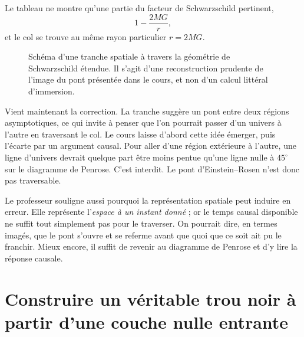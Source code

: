 Le tableau ne montre qu’une partie du facteur de Schwarzschild pertinent,
\begin{equation}
1-\frac{2MG}{r},
\end{equation}
et le col se trouve au même rayon particulier \(r=2MG\).

\begin{figure}[htbp]
\centering
{}
\caption{Schéma d’une tranche spatiale à travers la géométrie de Schwarzschild étendue. Il s’agit d’une reconstruction prudente de l’image du pont présentée dans le cours, et non d’un calcul littéral d’immersion.}
\end{figure}

Vient maintenant la correction. La tranche suggère un pont entre deux régions asymptotiques, ce qui invite à penser que l’on pourrait passer d’un univers à l’autre en traversant le col. Le cours laisse d’abord cette idée émerger, puis l’écarte par un argument causal. Pour aller d’une région extérieure à l’autre, une ligne d’univers devrait quelque part être moins pentue qu’une ligne nulle à \(45^\circ\) sur le diagramme de Penrose. C’est interdit. Le pont d’Einstein--Rosen n’est donc pas traversable.

Le professeur souligne aussi pourquoi la représentation spatiale peut induire en erreur. Elle représente l’\emph{espace à un instant donné} ; or le temps causal disponible ne suffit tout simplement pas pour le traverser. On pourrait dire, en termes imagés, que le pont s’ouvre et se referme avant que quoi que ce soit ait pu le franchir. Mieux encore, il suffit de revenir au diagramme de Penrose et d’y lire la réponse causale.

\section{Construire un véritable trou noir à partir d’une couche nulle entrante}

